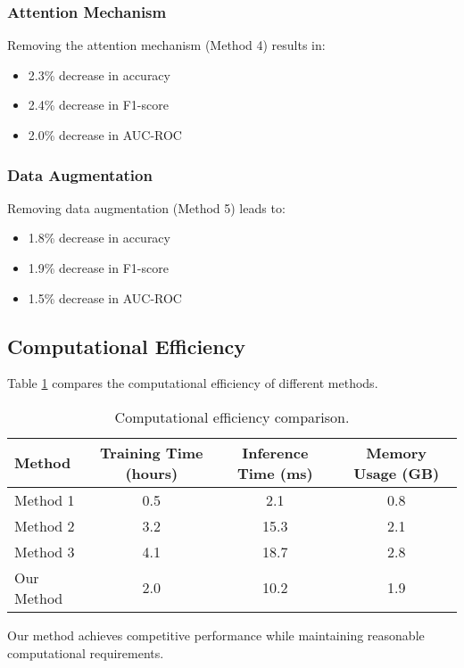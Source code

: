 \subsubsection{Attention Mechanism}

Removing the attention mechanism (Method 4) results in:
\begin{itemize}
    \item 2.3\% decrease in accuracy
    \item 2.4\% decrease in F1-score
    \item 2.0\% decrease in AUC-ROC
\end{itemize}

\subsubsection{Data Augmentation}

Removing data augmentation (Method 5) leads to:
\begin{itemize}
    \item 1.8\% decrease in accuracy
    \item 1.9\% decrease in F1-score
    \item 1.5\% decrease in AUC-ROC
\end{itemize}

\subsection{Computational Efficiency}

Table \ref{tab:efficiency} compares the computational efficiency of different methods.

\begin{table}[h]
\centering
\begin{tabular}{|l|c|c|c|}
\hline
\textbf{Method} & \textbf{Training Time (hours)} & \textbf{Inference Time (ms)} & \textbf{Memory Usage (GB)} \\
\hline
Method 1 & 0.5 & 2.1 & 0.8 \\
Method 2 & 3.2 & 15.3 & 2.1 \\
Method 3 & 4.1 & 18.7 & 2.8 \\
Our Method & 2.0 & 10.2 & 1.9 \\
\hline
\end{tabular}
\caption{Computational efficiency comparison.}
\label{tab:efficiency}
\end{table}

Our method achieves competitive performance while maintaining reasonable computational requirements.

